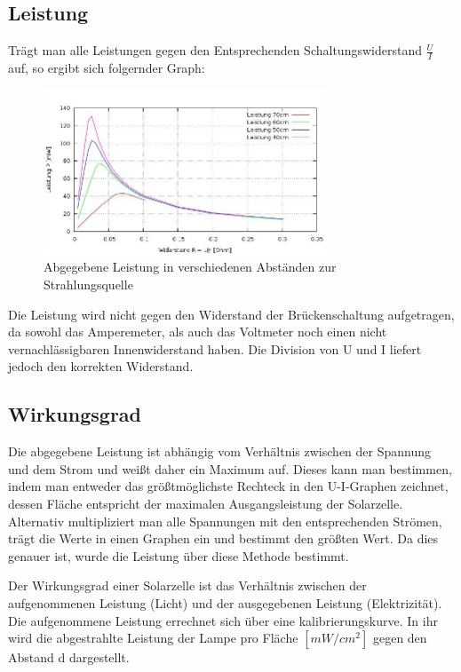 \subsection{Leistung}
Trägt man alle Leistungen gegen den Entsprechenden Schaltungswiderstand $\frac{U}{I}$ auf, so ergibt sich folgernder Graph:

\begin{figure}[H]
	\includegraphics[width=0.75\textwidth]{pics/alle_L.jpg}
	\caption{Abgegebene Leistung in verschiedenen Abständen zur Strahlungsquelle}
\end{figure}

Die Leistung wird nicht gegen den Widerstand der Brückenschaltung aufgetragen, da sowohl das Amperemeter, als auch das Voltmeter noch einen nicht vernachlässigbaren Innenwiderstand haben.
Die Division von U und I liefert jedoch den korrekten Widerstand.

\subsection{Wirkungsgrad}
Die abgegebene Leistung ist abhängig vom Verhältnis zwischen der Spannung und dem Strom und weißt daher  ein Maximum auf. Dieses kann man bestimmen, indem man entweder das größtmöglichste Rechteck in den U-I-Graphen zeichnet, dessen Fläche entspricht der maximalen Ausgangsleistung der Solarzelle. Alternativ multipliziert man alle Spannungen mit den entsprechenden Strömen, trägt die Werte in einen Graphen ein und bestimmt den größten Wert. Da dies genauer ist, wurde die Leistung über diese Methode bestimmt.

Der Wirkungsgrad einer Solarzelle ist das Verhältnis zwischen der aufgenommenen Leistung (Licht) und der ausgegebenen Leistung (Elektrizität).
Die aufgenommene Leistung errechnet sich über eine kalibrierungskurve. In ihr wird die abgestrahlte Leistung der Lampe pro Fläche $[mW/cm^2]$ gegen den Abstand d dargestellt.\\


